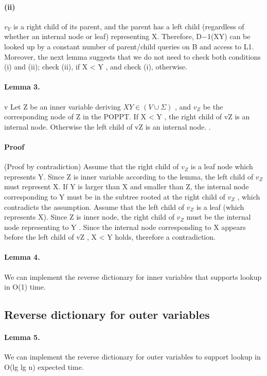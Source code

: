 \documentclass[a4paper,portrait,10pt,onecolumn]{article}
\begin{document}
			\paragraph{(ii)}
			 $v_Y$ is a right child of its parent, and the parent has a left child (regardless of whether an internal node or leaf) representing X. Therefore, D−1(XY) can be looked up by a constant number of parent/child queries on B and access to L1. Moreover, the next lemma suggests that we do not need to check both conditions (i) and (ii); check (ii), if X < Y , and check (i), otherwise.
			\paragraph{Lemma 3.}
v				Let Z be an inner variable deriving $XY \in (V \cup \Sigma)$ , and $v_Z$ be the corresponding
				node of Z in the POPPT. If X < Y , the right child of vZ is an internal node. Otherwise the left child of vZ is an internal node.
				\cite[see][3.2.1]{latexcompanion}  \cite{einstein}.
			\paragraph{Proof}
				(Proof by contradiction)
				 Assume that the right child of $v_Z$ is a leaf node which
				represents Y. Since Z is inner variable according to the lemma, the left child of $v_Z$ must represent X. If Y is larger than X and smaller than Z, the internal node corresponding to Y must
				be in the subtree rooted at the right child of $v_Z$ , which contradicts the assumption.
				Assume that the left child of $v_Z$ is a leaf (which
				represents X). Since Z is inner node, the right child of $v_Z$ must be the internal node representing
				to Y . Since the internal node corresponding to X appears before the left child of vZ , X < Y
				holds, therefore a contradiction.                                                       
			\paragraph{Lemma 4.}  
				 We can implement the reverse dictionary for inner variables that supports lookup in O(1) time.
			
		\subsection{Reverse dictionary for outer variables}
			\paragraph{Lemma 5.} 
			 	We can implement the reverse dictionary for outer variables to support lookup
				in O(lg lg n) expected time.
\end{document}
